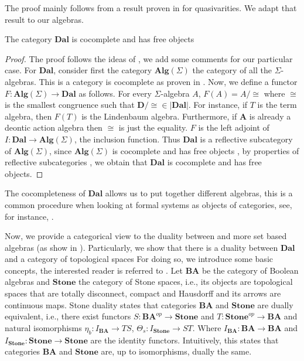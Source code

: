 The proof mainly follows from a result proven in \cite{Adamek04} for quasivarities.  We adapt that result to our algebras.
\medskip
\begin{theorem}\label{theorem:cocompleteness} The category $\mathbf{Dal}$  is  cocomplete and has free objects
\end{theorem}
\begin{proof} The proof follows the ideas of \cite{Adamek04}, we add some comments for our particular case.  For $\mathbf{Dal}$, consider first the category $\mathbf{Alg}(\Sigma)$ the category of all the $\Sigma$-algebras.  This is a category is cocomplete  as proven in \cite{Tarlecki91}.  Now, we  define a functor $F : \mathbf{Alg}(\Sigma) \rightarrow \mathbf{Dal}$ as follows. For every $\Sigma$-algebra 
$A$, $F(A) = A/\cong$ where $\cong$ is the smallest congruence such that $\mathbf{D}/\cong \in |\mathbf{Dal}|$.  For instance,  if $T$ is the term algebra, then $F(T)$ is the Lindenbaum algebra. Furthermore,  if 
$\mathbf{A}$ is already a deontic action algebra then $\cong$ is just the equality.  $F$ is the left adjoint of $I:\mathbf{Dal} \rightarrow \mathbf{Alg}(\Sigma)$, the inclusion function.  Thus $\mathbf{Dal}$ is a reflective subcategory of $\mathbf{Alg}(\Sigma)$, since
$\mathbf{Alg}(\Sigma)$ is cocomplete and has free objects \cite{Tarlecki91},  by properties of reflective subcategories \cite{MacLane98},  we obtain that $\mathbf{Dal}$ is cocomplete and has free objects.
\end{proof}
The cocompleteness of $\mathbf{Dal}$ allows us to put together different algebras,  this is a common procedure when looking at formal systems as objects of categories,  see, for instance,  \cite{Goguen92}.

Now, we provide a categorical view to the duality between \DAL and more set based algebras (as show in ).  Particularly, we show that there is a duality between $\mathbf{Dal}$ and a category of topological spaces For doing so, we introduce some basic concepts, the interested reader is referred to \cite{Johnstone82}.
Let $\mathbf{BA}$ be the category of Boolean algebras and $\textbf{Stone}$ the category of Stone spaces, i.e.,  its objects are topological spaces that are totally disconnect, compact and Hausdorff   and its arrows are continuous maps.  Stone duality states that categories $\mathbf{BA}$ and $\textbf{Stone}$ are dually equivalent, i.e.,  there exist functors $S: \mathbf{BA}^{op} \rightarrow \mathbf{Stone}$ and 
$T: \mathbf{Stone}^{op} \rightarrow \mathbf{BA}$ and natural isomorphisms $\eta_b : I_{\mathbf{BA}} \rightarrow TS$,  $\Theta_s : I_{\mathbf{Stone}} \rightarrow ST$.   Where $I_{\mathbf{BA}}: \mathbf{BA} \rightarrow \mathbf{BA}$ and $I_{\mathbf{Stone}}: \mathbf{Stone} \rightarrow \mathbf{Stone}$ are the identity functors.
Intuitively, this states that categories 
$\mathbf{BA}$ and $\mathbf{Stone}$ are,  up to isomorphisms,  dually the same.

